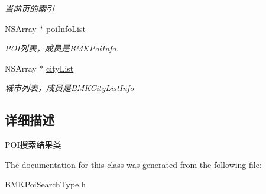 \begin{DoxyCompactItemize}
\begin{DoxyCompactList}\small\item\em 当前页的索引 \end{DoxyCompactList}\item 
\hypertarget{interface_b_m_k_poi_result_a4f5475068a92bab6e67f47654e8c6256}{N\-S\-Array $\ast$ \hyperlink{interface_b_m_k_poi_result_a4f5475068a92bab6e67f47654e8c6256}{poi\-Info\-List}}\label{interface_b_m_k_poi_result_a4f5475068a92bab6e67f47654e8c6256}

\begin{DoxyCompactList}\small\item\em P\-O\-I列表，成员是\-B\-M\-K\-Poi\-Info. \end{DoxyCompactList}\item 
\hypertarget{interface_b_m_k_poi_result_a8315d8ec2e803b8dd3af74b197b4aa80}{N\-S\-Array $\ast$ \hyperlink{interface_b_m_k_poi_result_a8315d8ec2e803b8dd3af74b197b4aa80}{city\-List}}\label{interface_b_m_k_poi_result_a8315d8ec2e803b8dd3af74b197b4aa80}

\begin{DoxyCompactList}\small\item\em 城市列表，成员是\-B\-M\-K\-City\-List\-Info \end{DoxyCompactList}\end{DoxyCompactItemize}


\subsection{详细描述}
P\-O\-I搜索结果类 

The documentation for this class was generated from the following file\-:\begin{DoxyCompactItemize}
\item 
B\-M\-K\-Poi\-Search\-Type.\-h\end{DoxyCompactItemize}
